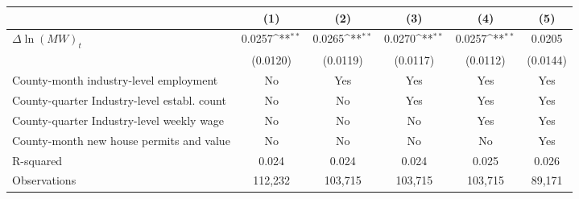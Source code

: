 {
\def\sym#1{\ifmmode^{#1}\else\(^{#1}\)\fi}
\begin{tabular}{l*{5}{c}}
\hline\hline
          &\multicolumn{1}{c}{(1)}         &\multicolumn{1}{c}{(2)}         &\multicolumn{1}{c}{(3)}         &\multicolumn{1}{c}{(4)}         &\multicolumn{1}{c}{(5)}         \\
\hline
$\Delta \ln(MW)_{t}$&   0.0257\sym{**} &   0.0265\sym{**} &   0.0270\sym{**} &   0.0257\sym{**} &   0.0205         \\
          & (0.0120)         & (0.0119)         & (0.0117)         & (0.0112)         & (0.0144)         \\
\hline
County-month industry-level employment&       No         &      Yes         &      Yes         &      Yes         &      Yes         \\
County-quarter Industry-level establ. count&       No         &       No         &      Yes         &      Yes         &      Yes         \\
County-quarter Industry-level weekly wage&       No         &       No         &       No         &      Yes         &      Yes         \\
County-month new house permits and value&       No         &       No         &       No         &       No         &      Yes         \\
R-squared &    0.024         &    0.024         &    0.024         &    0.025         &    0.026         \\
Observations&  112,232         &  103,715         &  103,715         &  103,715         &   89,171         \\
\hline\hline
\end{tabular}
}
